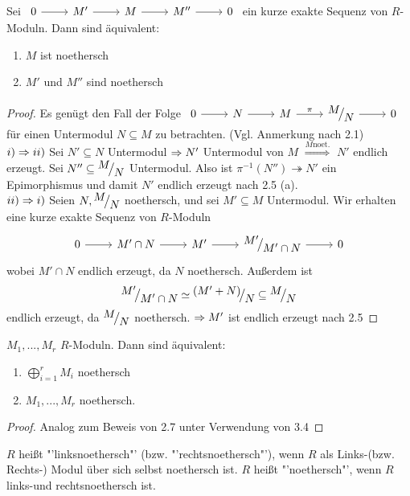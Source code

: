 \begin{bem}
	Sei $\begin{tikzcd}
	0  \arrow{r} & M' \arrow{r} & M \arrow{r} & M'' \arrow{r} & 0
	\end{tikzcd} $ ein kurze exakte Sequenz von $R$-Moduln. Dann sind äquivalent: 
	\begin{enumerate} [label= \roman*)]
		\item $M$ ist noethersch
		\item $M'$ und $M''$ sind noethersch
	\end{enumerate}
\end{bem}
\begin{proof}
	Es genügt den Fall der Folge $\begin{tikzcd}
	0  \arrow{r} & N\arrow{r}{} & M \arrow{r}{\pi} & \QR{M}{N} \arrow{r} & 0
	\end{tikzcd} $ für einen Untermodul $N \subseteq M $ zu betrachten. (Vgl. Anmerkung nach 2.1)\\
	$i) \Rightarrow ii)$ Sei $N' \subseteq N $ Untermodul $\Rightarrow N' $ Untermodul von $M$ $\overset{M \text{noet.}}{\Longrightarrow} $ $N' $ endlich erzeugt. Sei $N'' \subseteq \QR{M}{N}$ Untermodul. Also ist $\pi^{-1}(N'') \twoheadrightarrow N'$ ein Epimorphismus und damit $ N' $ endlich erzeugt nach 2.5 (a). \\
	$ii) \Rightarrow i)$ Seien $N, \QR{M}{N}$ noethersch, und sei $M' \subseteq M $ Untermodul. Wir erhalten eine kurze exakte Sequenz von $R$-Moduln  $$\begin{tikzcd}
	0  \arrow{r} & M' \cap N \arrow{r}{} & M' \arrow{r}{} & \QR{M'}{M' \cap N} \arrow{r} & 0
	\end{tikzcd} $$wobei $M' \cap N $ endlich erzeugt, da $N$ noethersch. Außerdem ist $$\QR{M'}{M' \cap N} \simeq \QR{(M'+N)}{N} \subseteq \QR{M}{N} $$ endlich erzeugt, da $\QR{M}{N} $ noethersch. $\Rightarrow M' $ ist endlich erzeugt nach 2.5
\end{proof}
\begin{bem}
	$M_1,...,M_r$ $R$-Moduln. Dann sind äquivalent: 
	\begin{enumerate} [label= \roman*)]
		\item $\bigoplus_{i=1}^r M_i $ noethersch 
		\item $M_1,...,M_r $ noethersch.
	\end{enumerate}
\end{bem}
\begin{proof}
	Analog zum Beweis von 2.7 unter Verwendung von 3.4
\end{proof}
\begin{df}
	$R$ heißt "'linksnoethersch"' (bzw. "'rechtsnoethersch"'), wenn $R$ als Links-(bzw. Rechts-) Modul über sich selbst noethersch ist. $R$ heißt "'noethersch"', wenn $R$ links-und rechtsnoethersch ist.
\end{df}
